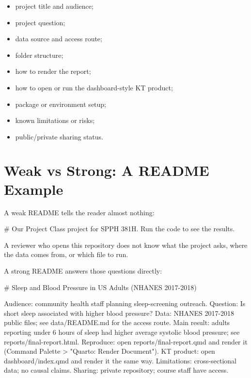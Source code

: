 \documentclass[
  letterpaper,
  DIV=11,
  numbers=noendperiod,
  oneside]{scrreprt}
\newenvironment{Shaded}{\begin{snugshade}}{\end{snugshade}}
\newcommand{\NormalTok}[1]{\textcolor[rgb]{0.00,0.23,0.31}{#1}}
\providecommand{\tightlist}{%
  \setlength{\itemsep}{0pt}\setlength{\parskip}{0pt}}
\begin{document}
\begin{itemize}
\tightlist
\item
  project title and audience;
\item
  project question;
\item
  data source and access route;
\item
  folder structure;
\item
  how to render the report;
\item
  how to open or run the dashboard-style KT product;
\item
  package or environment setup;
\item
  known limitations or risks;
\item
  public/private sharing status.
\end{itemize}

\section*{Weak vs Strong: A README
Example}\label{weak-vs-strong-a-readme-example}


A weak README tells the reader almost nothing:

\begin{Shaded}
\begin{Highlighting}[numbers=left,,]
\NormalTok{\# Our Project}
\NormalTok{Class project for SPPH 381H. Run the code to see the results.}
\end{Highlighting}
\end{Shaded}

A reviewer who opens this repository does not know what the project
asks, where the data comes from, or which file to run.

A strong README answers those questions directly:

\begin{Shaded}
\begin{Highlighting}[numbers=left,,]
\NormalTok{\# Sleep and Blood Pressure in US Adults (NHANES 2017{-}2018)}

\NormalTok{Audience: community health staff planning sleep{-}screening outreach.}
\NormalTok{Question: Is short sleep associated with higher blood pressure?}
\NormalTok{Data: NHANES 2017{-}2018 public files; see data/README.md for the access route.}
\NormalTok{Main result: adults reporting under 6 hours of sleep had higher average}
\NormalTok{  systolic blood pressure; see reports/final{-}report.html.}
\NormalTok{Reproduce: open reports/final{-}report.qmd and render it}
\NormalTok{  (Command Palette \textgreater{} "Quarto: Render Document").}
\NormalTok{KT product: open dashboard/index.qmd and render it the same way.}
\NormalTok{Limitations: cross{-}sectional data; no causal claims.}
\NormalTok{Sharing: private repository; course staff have access.}
\end{Highlighting}
\end{Shaded}
\end{document}
